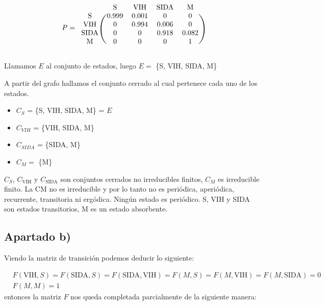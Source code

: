 \documentclass[11pt]{article}
\begin{document}
\begin{equation*}
  P = 
  \begin{blockarray}{ccccc}
     & \text{S} & \text{VIH} & \text{SIDA} & \text{M} \\
    \begin{block}{c(cccc)}
      \text{S}    & 0.999 & 0.001 & 0     & 0 \\
      \text{VIH}  & 0     & 0.994 & 0.006 & 0 \\
      \text{SIDA} & 0     & 0     & 0.918 & 0.082 \\
      \text{M}    & 0     & 0     & 0     & 1 \\
    \end{block}
  \end{blockarray}
\end{equation*}

Llamamos $E$ al conjunto de estados, luego $E =$ \{S, VIH, SIDA, M\}

A partir del grafo hallamos el conjunto cerrado al cual pertenece cada uno de
los estados.
\begin{itemize}
  \item $C_S$ = \{S, VIH, SIDA, M\} = $E$
  \item $C_{VIH}$ = \{VIH, SIDA, M\}
  \item $C_{SIDA}$ = \{SIDA, M\}
  \item $C_M =$ \{M\}
\end{itemize}

$C_S$, $C_{\text{VIH}}$ y $C_{\text{SIDA}}$ son conjuntos cerrados no irreducibles finitos,
$C_M$ es irreducible finito.
La CM no es irreducible y por lo tanto no es periódica, aperiódica, recurrente, transitoria ni ergódica.
Ningún estado es periódico.
S, VIH y SIDA son estados transitorios, M es un estado absorbente.


\subsection*{Apartado b)}

Viendo la matriz de transición podemos deducir lo siguiente:

\begin{align*}
&F(\text{VIH}, S) = F(\text{SIDA}, S) = F(\text{SIDA}, \text{VIH}) = F(M, S) = F(M, \text{VIH}) = F(M, \text{SIDA}) = 0 \\
&F(M, M) = 1
\end{align*}
entonces la matriz $ F $ nos queda completada parcialmente de la siguiente manera:
\end{document}
